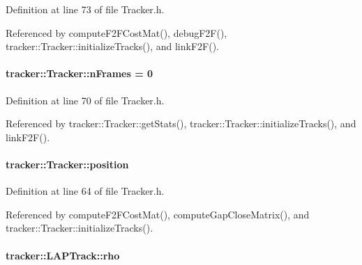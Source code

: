Definition at line 73 of file Tracker.\+h.



Referenced by compute\+F2\+F\+Cost\+Mat(), debug\+F2\+F(), tracker\+::\+Tracker\+::initialize\+Tracks(), and link\+F2\+F().

\paragraph[{\texorpdfstring{n\+Frames}{nFrames}}]{ tracker\+::\+Tracker\+::n\+Frames = 0\hspace{0.3cm}{\ttfamily [inherited]}}\hypertarget{classtracker_1_1Tracker_a103afa608ae5693103d81e040a9e29d6}{}\label{classtracker_1_1Tracker_a103afa608ae5693103d81e040a9e29d6}


Definition at line 70 of file Tracker.\+h.



Referenced by tracker\+::\+Tracker\+::get\+Stats(), tracker\+::\+Tracker\+::initialize\+Tracks(), and link\+F2\+F().

\paragraph[{\texorpdfstring{position}{position}}]{ tracker\+::\+Tracker\+::position\hspace{0.3cm}{\ttfamily [inherited]}}\hypertarget{classtracker_1_1Tracker_a89978ed5ec72607820f45f3dcf63dd04}{}\label{classtracker_1_1Tracker_a89978ed5ec72607820f45f3dcf63dd04}


Definition at line 64 of file Tracker.\+h.



Referenced by compute\+F2\+F\+Cost\+Mat(), compute\+Gap\+Close\+Matrix(), and tracker\+::\+Tracker\+::initialize\+Tracks().

\paragraph[{\texorpdfstring{rho}{rho}}]{ tracker\+::\+L\+A\+P\+Track\+::rho}\hypertarget{classtracker_1_1LAPTrack_a67d4adb49fbda172c6ea701c93985713}{}\label{classtracker_1_1LAPTrack_a67d4adb49fbda172c6ea701c93985713}


